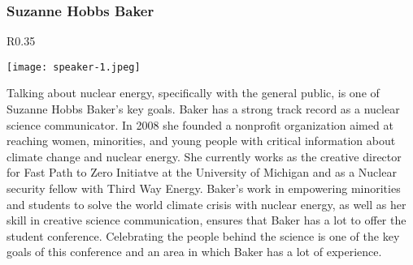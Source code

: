\subsubsection{Suzanne Hobbs Baker}
\setlength\intextsep{0pt}
\begin{wrapfigure}{R}{0.35\textwidth}
	\begin{center}
		\vspace{-\baselineskip}
		\texttt{[image: speaker-1.jpeg]}
	\end{center}
\end{wrapfigure}
Talking about nuclear energy, specifically with the general public, is one of Suzanne Hobbs Baker's key goals. Baker has a strong track record as a nuclear science communicator. In 2008 she founded a nonprofit organization aimed at reaching women, minorities, and young people with critical information about climate change and nuclear energy. She currently works as the creative director for Fast Path to Zero Initiatve at the University of Michigan and as a Nuclear security fellow with Third Way Energy. Baker's work in empowering minorities and students to solve the world climate crisis with nuclear energy, as well as her skill in creative science communication, ensures that Baker has a lot to offer the student conference. Celebrating the people behind the science is one of the key goals of this conference and an area in which Baker has a lot of experience.\\

